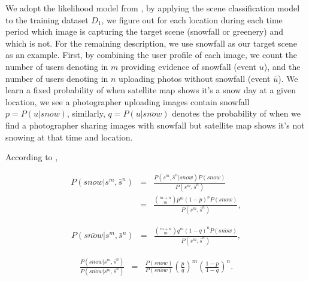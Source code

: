 We adopt the likelihood model from , by applying the scene classification model 
to the training dataset $D_1$, we figure out for each location during each time period which image
is 
capturing the target scene (snowfall or greenery) and which is not. For the remaining description, 
we use snowfall as our target scene as an example. First, by combining the 
user profile of each image, we count the number of users denoting in $m$ providing evidence of 
snowfall (event $u$), and 
the number of users denoting in $n$ uploading photos without snowfall (event $\bar{u}$). We learn a 
fixed probability of when satellite map shows it's a snow day at a given location, we see a photographer 
uploading images contain snowfall $p = P(u|snow)$, similarly, $q = P(u|\bar{snow})$ denotes the 
probability of when we find a photographer sharing images with snowfall but 
satellite map shows it's not snowing at that time and location.

According to ,
\newcommand{\smsn}{s^m, \bar{s}^n}
\newcommand{\smsntwo}{s^m, \bar{s}^n}

\begin{eqnarray*}
P(snow|\smsn) &=&\frac{ P(\smsn|snow)P(snow)}{P(\smsntwo)} \\
&=&\frac{{m+n\choose m}p^{m}(1-p)^{n}P(snow)}{P(\smsntwo)}, 
\end{eqnarray*}

\begin{eqnarray*}
P(\overline{snow}|\smsn) &=&\frac{{m+n\choose m}q^{m}(1-q)^{n}P(\overline{snow})}{P(\smsntwo)}, 
\end{eqnarray*}

\begin{eqnarray}
\frac{P(snow|\smsn)}{P(\overline{snow}|\smsntwo)}
&=&\frac{P(snow)}{P(\overline{snow})}\left(\frac{p}{q}\right)^{m}\left(\frac{1-p}{1-q}\right)^n.
\label{eq:conf}
\end{eqnarray}




